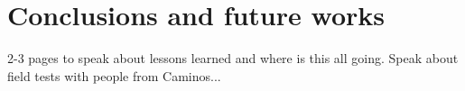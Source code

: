 \documentclass[a4paper,10pt,twoside]{book}
\begin{document}
\chapter{ Conclusions and future works}
	2-3 pages to speak about lessons learned and where is this all going. Speak about field tests with people from Caminos...

% 



\vfill \pagebreak \thispagestyle{empty} \mbox{}
\vfill \pagebreak \mbox{} \thispagestyle{empty}
\end{document}
